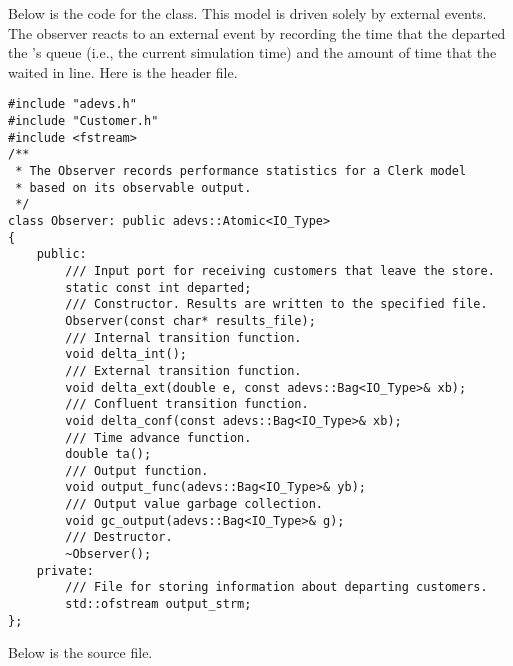 Below is the code for the  class. This model is driven solely by external events. The observer reacts to an external event by recording the time that the  departed the 's queue (i.e., the current simulation time) and the amount of time that the  waited in line. Here is the  header file.
\begin{verbatim}
#include "adevs.h"
#include "Customer.h"
#include <fstream>
/**
 * The Observer records performance statistics for a Clerk model
 * based on its observable output.
 */
class Observer: public adevs::Atomic<IO_Type>
{
    public:
        /// Input port for receiving customers that leave the store.
        static const int departed;
        /// Constructor. Results are written to the specified file.
        Observer(const char* results_file);
        /// Internal transition function.
        void delta_int();
        /// External transition function.
        void delta_ext(double e, const adevs::Bag<IO_Type>& xb);
        /// Confluent transition function.
        void delta_conf(const adevs::Bag<IO_Type>& xb);
        /// Time advance function.
        double ta();
        /// Output function.  
        void output_func(adevs::Bag<IO_Type>& yb);
        /// Output value garbage collection.
        void gc_output(adevs::Bag<IO_Type>& g);
        /// Destructor.
        ~Observer();
    private:    
        /// File for storing information about departing customers.
        std::ofstream output_strm;
}; 
\end{verbatim}
Below is the  source file.

